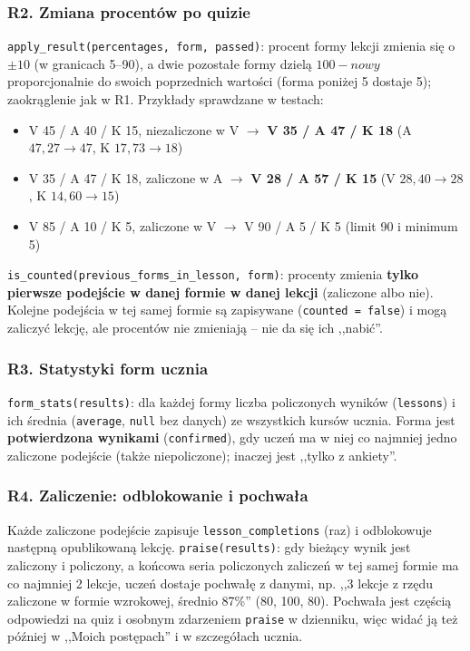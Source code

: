 \subsubsection{R2. Zmiana procentów po quizie}
\texttt{apply\_result(percentages, form, passed)}: procent formy lekcji zmienia się o $\pm 10$ (w granicach 5--90), a dwie pozostałe formy dzielą $100 - \textit{nowy}$ proporcjonalnie do swoich poprzednich wartości (forma poniżej 5 dostaje 5); zaokrąglenie jak w R1. Przykłady sprawdzane w testach:
\begin{itemize}[leftmargin=*]
    \item V 45 / A 40 / K 15, niezaliczone w V $\to$ \textbf{V 35 / A 47 / K 18} (A $47{,}27 \to 47$, K $17{,}73 \to 18$)
    \item V 35 / A 47 / K 18, zaliczone w A $\to$ \textbf{V 28 / A 57 / K 15} (V $28{,}40 \to 28$, K $14{,}60 \to 15$)
    \item V 85 / A 10 / K 5, zaliczone w V $\to$ V 90 / A 5 / K 5 (limit 90 i minimum 5)
\end{itemize}

\texttt{is\_counted(previous\_forms\_in\_lesson, form)}: procenty zmienia \textbf{tylko pierwsze podejście w danej formie w danej lekcji} (zaliczone albo nie). Kolejne podejścia w tej samej formie są zapisywane (\texttt{counted = false}) i mogą zaliczyć lekcję, ale procentów nie zmieniają -- nie da się ich ,,nabić''.

\subsubsection{R3. Statystyki form ucznia}
\texttt{form\_stats(results)}: dla każdej formy liczba policzonych wyników (\texttt{lessons}) i ich średnia (\texttt{average}, \texttt{null} bez danych) ze wszystkich kursów ucznia. Forma jest \textbf{potwierdzona wynikami} (\texttt{confirmed}), gdy uczeń ma w niej co najmniej jedno zaliczone podejście (także niepoliczone); inaczej jest ,,tylko z ankiety''.

\subsubsection{R4. Zaliczenie: odblokowanie i pochwała}
Każde zaliczone podejście zapisuje \texttt{lesson\_completions} (raz) i odblokowuje następną opublikowaną lekcję. \texttt{praise(results)}: gdy bieżący wynik jest zaliczony i policzony, a końcowa seria policzonych zaliczeń w tej samej formie ma co najmniej 2 lekcje, uczeń dostaje pochwałę z danymi, np. ,,3 lekcje z rzędu zaliczone w formie wzrokowej, średnio 87\%'' (80, 100, 80). Pochwała jest częścią odpowiedzi na quiz i osobnym zdarzeniem \texttt{praise} w dzienniku, więc widać ją też później w ,,Moich postępach'' i w szczegółach ucznia.

